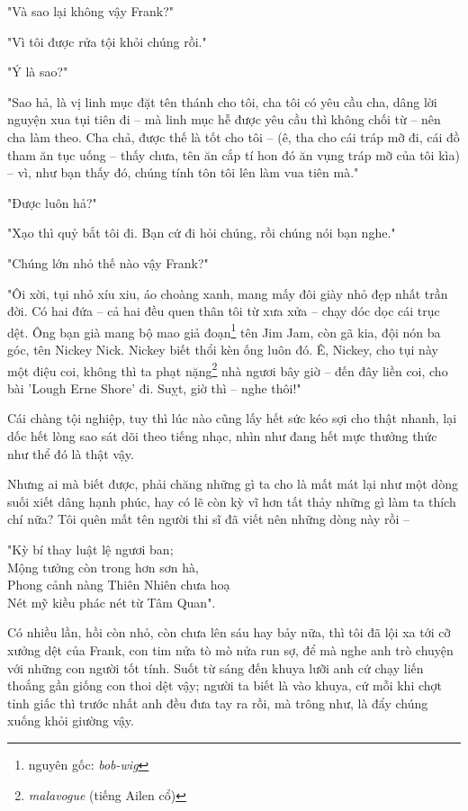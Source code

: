 "Và sao lại không vậy Frank?"

"Vì tôi được rửa tội khỏi chúng rồi."

"Ý là sao?"

"Sao hả, là vị linh mục đặt tên thánh cho tôi, cha tôi có yêu cầu cha, dâng lời nguyện xua tụi tiên đi – mà linh mục hễ được yêu cầu thì không chối từ – nên cha làm theo. Cha chả, được thế là tốt cho tôi – (ê, tha cho cái tráp mỡ đi, cái đồ tham ăn tục uống – thấy chưa, tên ăn cắp tí hon đó ăn vụng tráp mỡ của tôi kìa) – vì, như bạn thấy đó, chúng tính tôn tôi lên làm vua tiên mà."

"Được luôn hả?"

"Xạo thì quỷ bắt tôi đi. Bạn cứ đi hỏi chúng, rồi chúng nói bạn nghe."

"Chúng lớn nhỏ thế nào vậy Frank?"

"Ôi xời, tụi nhỏ xíu xiu, áo choàng xanh, mang mấy đôi giày nhỏ đẹp nhất trần đời. Có hai đứa – cả hai đều quen thân tôi từ xưa xửa – chạy dóc dọc cái trục dệt. Ông bạn già mang bộ mao giả đoạn\footnote{nguyên gốc: \textit{bob-wig}} tên Jim Jam, còn gã kia, đội nón ba góc, tên Nickey Nick. Nickey biết thổi kèn ống luôn đó. Ê, Nickey, cho tụi này một điệu coi, không thì ta phạt nặng\footnote{\textit{malavogue} (tiếng Ailen cổ)} nhà ngươi bây giờ – đến đây liền coi, cho bài 'Lough Erne Shore' đi. Suỵt, giờ thì – nghe thôi!"

Cái chàng tội nghiệp, tuy thì lúc nào cũng lấy hết sức kéo sợi cho thật nhanh, lại dốc hết lòng sao sát dõi theo tiếng nhạc, nhìn như đang hết mực thưởng thức như thể đó là thật vậy.

Nhưng ai mà biết được, phải chăng những gì ta cho là mất mát lại như một dòng suối xiết dâng hạnh phúc, hay có lẽ còn kỳ vĩ hơn tất thảy những gì làm ta thích chí nữa? Tôi quên mất tên người thi sĩ đã viết nên những dòng này rồi –

\begin{center}
  "Kỳ bí thay luật lệ ngươi ban;\\
  Mộng tưởng còn trong hơn sơn hà,\\
  Phong cảnh nàng Thiên Nhiên chưa hoạ\\
  Nét mỹ kiều phác nét từ Tâm Quan".\\
\end{center}

Có nhiều lần, hồi còn nhỏ, còn chưa lên sáu hay bảy nữa, thì tôi đã lội xa tới cỡ xưởng dệt của Frank, con tim nửa tò mò nửa run sợ, để mà nghe anh trò chuyện với những con người tốt tính. Suốt từ sáng đến khuya lưỡi anh cứ chạy liến thoắng gần giống con thoi dệt vậy; người ta biết là vào khuya, cứ mỗi khi chợt tỉnh giấc thì trước nhất anh đều đưa tay ra rồi, mà trông như, là đẩy chúng xuống khỏi giường vậy.

